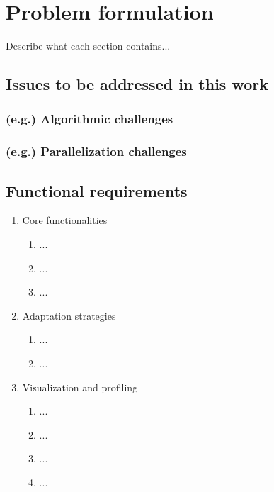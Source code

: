 
\chapter{Problem formulation} \label{chap:problem-formulation}

Describe what each section contains...

\section{Issues to be addressed in this work}

\subsection{(e.g.) Algorithmic challenges}

\bt

\subsection{(e.g.) Parallelization challenges}

\bt

\section{Functional requirements}

\begin{enumerate}
	\item Core functionalities
	\begin{enumerate}
		\item ...
		\item ...
		\item ...
	\end{enumerate}

	\item Adaptation strategies
	\begin{enumerate}
		\item ...
		\item ...
	\end{enumerate}

	\item Visualization and profiling
	\begin{enumerate}
		\item ...
		\item ...
		\item ...
		\item ...
	\end{enumerate}
\end{enumerate}


